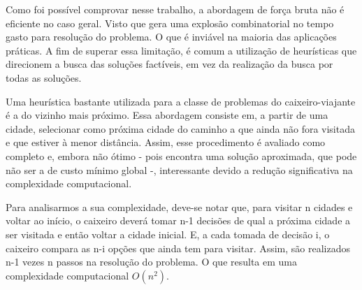 \documentclass[a4paper, 12pt]{article} %
\begin{document}
	Como foi possível comprovar nesse trabalho, a abordagem de força bruta não é eficiente no caso geral. Visto que gera uma explosão combinatorial no tempo gasto para resolução do problema. O que é inviável na maioria das aplicações práticas. A fim de superar essa limitação, é comum a utilização de heurísticas que direcionem a busca das soluções factíveis, em vez da realização da busca por todas as soluções.
	
	Uma heurística bastante utilizada para a classe de problemas do caixeiro-viajante é a do vizinho mais próximo. Essa abordagem consiste em, a partir de uma cidade, selecionar como próxima cidade do caminho a que ainda não fora visitada e que estiver à menor distância. Assim, esse procedimento é avaliado como completo e, embora não ótimo - pois encontra uma solução aproximada, que pode não ser a de custo mínimo global -, interessante devido a redução significativa na complexidade computacional.
	
	Para analisarmos a sua complexidade, deve-se notar que, para visitar n cidades e voltar ao início, o caixeiro deverá tomar n-1 decisões de qual a próxima cidade a ser visitada e então voltar a cidade inicial. E, a cada tomada de decisão i, o caixeiro compara as n-i opções que ainda tem para visitar. Assim, são realizados n-1 vezes n passos na resolução do problema. O que resulta em uma complexidade computacional $O(n^2)$.
	
\end{document}
